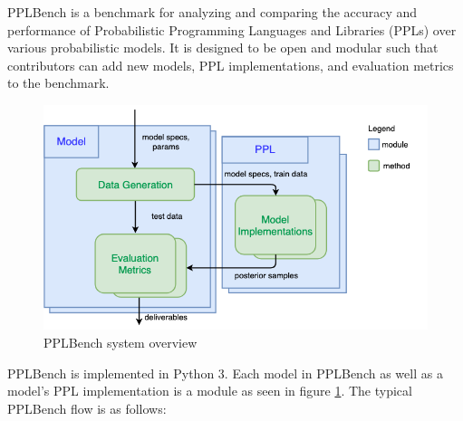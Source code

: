\documentclass[main.tex]{subfiles}
\begin{document}
PPLBench is a benchmark for analyzing and comparing the accuracy and performance of Probabilistic Programming Languages and Libraries (PPLs) over various probabilistic models. It is designed to be open and modular such that contributors can add new models, PPL implementations, and evaluation metrics to the benchmark.

\begin{figure}[h]
  \centering
  \includegraphics[width=150mm]{figures/system_overview.png}
  \caption{PPLBench system overview}
  \label{fig:fig1}

\end{figure}
PPLBench is implemented in Python 3\cite{Python}.
Each model in PPLBench as well as a model's PPL implementation is a module as seen in figure \ref{fig:fig1}. The typical PPLBench flow is as follows:
\end{document}
